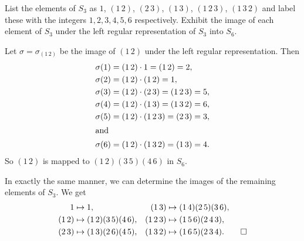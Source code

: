  List the elements of $S_3$ as $1$, $(1\,2)$, $(2\,3)$,
$(1\,3)$, $(1\,2\,3)$, $(1\,3\,2)$ and label these with the integers
$1,2,3,4,5,6$ respectively. Exhibit the image of each element of $S_3$
under the left regular representation of $S_3$ into $S_6$.
\begin{solution}
  Let $\sigma = \sigma_{(1\,2)}$ be the image of $(1\,2)$ under the
  left regular representation. Then
  \begin{align*}
    \sigma(1) &= (1\,2)\cdot1 = (1\,2) = 2, \\
    \sigma(2) &= (1\,2)\cdot(1\,2) = 1, \\
    \sigma(3) &= (1\,2)\cdot(2\,3) = (1\,2\,3) = 5, \\
    \sigma(4) &= (1\,2)\cdot(1\,3) = (1\,3\,2) = 6, \\
    \sigma(5) &= (1\,2)\cdot(1\,2\,3) = (2\,3) = 3, \\
    \intertext{and}
    \sigma(6) &= (1\,2)\cdot(1\,3\,2) = (1\,3) = 4.
  \end{align*}
  So $(1\,2)$ is mapped to $(1\,2)(3\,5)(4\,6)$ in $S_6$.

  In exactly the same manner, we can determine the images of the
  remaining elements of $S_3$. We get
  \begin{align*}
    1 &\mapsto 1,
    & (1\,3) &\mapsto (1\,4)(2\,5)(3\,6), \\
    (1\,2) &\mapsto (1\,2)(3\,5)(4\,6),
    & (1\,2\,3) &\mapsto (1\,5\,6)(2\,4\,3), \\
    (2\,3) &\mapsto (1\,3)(2\,6)(4\,5),
    & (1\,3\,2) &\mapsto (1\,6\,5)(2\,3\,4). \qedhere
  \end{align*}
\end{solution}
